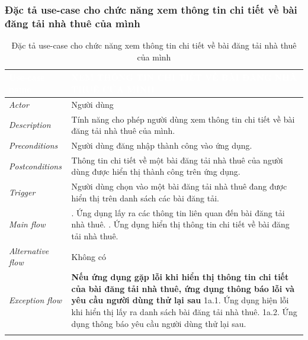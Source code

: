 \subsubsection{Đặc tả use-case cho chức năng xem thông tin chi tiết về bài đăng tải nhà thuê của mình}
\begin{center}
    \arrayrulewidth=2pt
    \begin{longtable}{
        |>{\raggedright\arraybackslash}p{3cm}
        |>{\raggedright\arraybackslash}p{13cm}
        |}
        \hline
        \rowcolor{cyan!75!black} \textcolor{white}{\textbf{Use-case name}} & \textcolor{white}{\textbf{XEM THÔNG TIN CHI TIẾT VỀ BÀI ĐĂNG NHÀ THUÊ CỦA MÌNH}}
        \\\hline
        \rowcolor{cyan!10!white} \textit{Actor} & Người dùng
        \\\hdashline
        \rowcolor{cyan!10!white} \textit{Description} & Tính năng cho phép người dùng xem thông tin chi tiết về bài đăng tải nhà thuê của mình.
        \\\hdashline
        \rowcolor{cyan!10!white} \textit{Preconditions} & Người dùng đăng nhập thành công vào ứng dụng.
        \\\hdashline
        \rowcolor{cyan!10!white} \textit{Postconditions} & Thông tin chi tiết về một bài đăng tải nhà thuê của người dùng được hiển thị thành công trên ứng dụng.
        \\\hdashline
        \rowcolor{cyan!10!white} \textit{Trigger} & Người dùng chọn vào một bài đăng tải nhà thuê đang được hiển thị trên danh sách các bài đăng tải.
        \\\hdashline
        \rowcolor{cyan!10!white} \textit{Main flow} &
        1. Ứng dụng lấy ra các thông tin liên quan đến bài đăng tải nhà thuê. \newline
        2. Ứng dụng hiển thị thông tin chi tiết về bài đăng tải nhà thuê.
        \\\hdashline
        \rowcolor{cyan!10!white} \textit{Alternative flow} & Không có
        \\\hdashline
        \rowcolor{cyan!10!white} \textit{Exception flow} &
        \textbf{Nếu ứng dụng gặp lỗi khi hiển thị thông tin chi tiết của bài đăng tải nhà thuê, ứng dụng thông báo lỗi và yêu cầu người dùng thử lại sau} \newline
        1a.1. Ứng dụng hiện lỗi khi hiển thị lấy ra danh sách bài đăng tải nhà thuê. \newline
        1a.2. Ứng dụng thông báo yêu cầu người dùng thử lại sau.
        \\\hline
        \caption{Đặc tả use-case cho chức năng xem thông tin chi tiết về bài đăng tải nhà thuê của mình}
    \end{longtable}
\end{center}
